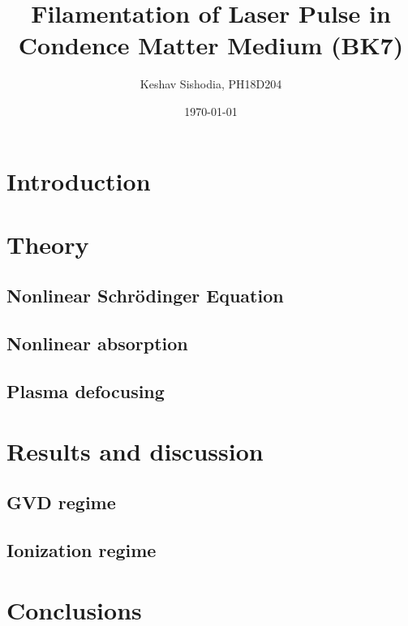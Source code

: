\documentclass[aps,prl,twocolumn,groupedaddress]{revtex4-2}
\begin{document}
\title{Filamentation of Laser Pulse in Condence Matter Medium (BK7)}
\author{Keshav Sishodia, PH18D204}
\date{\today}

\begin{abstract}
	
\end{abstract}

\maketitle

\section{Introduction}
	

\section{Theory}
	\subsection{Nonlinear Schrödinger Equation}
		
	\subsection{Nonlinear absorption}
		
	\subsection{Plasma defocusing}
		

\section{Results and discussion}
	
	\subsection{GVD regime}
		
	\subsection{Ionization regime}
		

\section{Conclusions}
	


\end{document}
